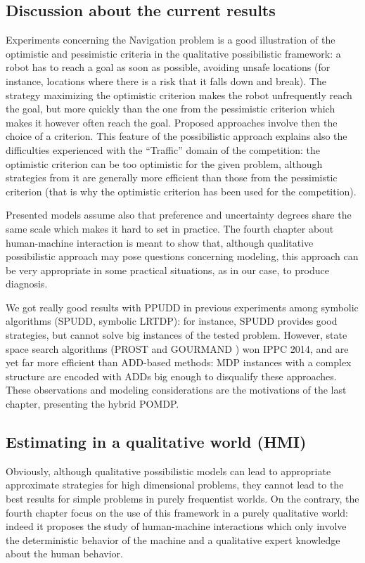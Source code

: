 \subsection*{Discussion about the current results}
Experiments concerning the Navigation problem
is a good illustration of the optimistic and pessimistic criteria
in the qualitative possibilistic framework: 
a robot has to reach a goal as soon as possible,
avoiding unsafe locations 
(for instance, locations where there is a risk that it falls down and break).
The strategy maximizing 
the optimistic criterion 
makes the robot 
unfrequently reach the goal,
but more quickly
than the one from the pessimistic criterion
which makes it however often reach the goal.  
Proposed approaches involve then 
the choice of a criterion.
This feature of the possibilistic approach
explains also the difficulties experienced
with the ``Traffic'' domain
of the competition: 
the optimistic criterion can be too optimistic
for the given problem, 
although strategies from it are generally 
more efficient than those from the pessimistic criterion
(that is why the optimistic criterion has been used for the competition).

Presented models 
assume also that preference
and uncertainty degrees
share the same scale
which makes it hard to
set in practice.
The fourth chapter about human-machine interaction
is meant to show that,
although qualitative possibilistic approach
may pose questions concerning modeling,
this approach can be very appropriate
in some practical situations,
as in our case, to produce diagnosis.

We got really good results 
with PPUDD in previous experiments 
among symbolic algorithms (SPUDD, symbolic LRTDP):
for instance, SPUDD provides good strategies, but 
cannot solve big instances of the tested problem. 
However, state space search algorithms
(PROST \cite{DBLP:conf/aips/KellerE12} and GOURMAND \cite{DBLP:conf/aaai/KolobovMW12}) won IPPC 2014,
and are yet far more efficient than ADD-based methods:
MDP instances with a complex structure
are encoded with ADDs big enough
to disqualify these approaches.
These observations and modeling considerations
are the motivations of the last chapter,
presenting the hybrid POMDP.


\subsection*{Estimating in a qualitative world (HMI)}
Obviously, although 
qualitative possibilistic models 
can lead to appropriate approximate strategies 
for high dimensional problems, 
they cannot lead to the best results
for simple problems
in purely frequentist worlds.
On the contrary, 
the fourth chapter focus on
the use of this framework
in a purely qualitative world:
indeed it proposes the study of
human-machine interactions
which only involve the deterministic 
behavior of the machine
and a qualitative expert knowledge
about the human behavior. 

